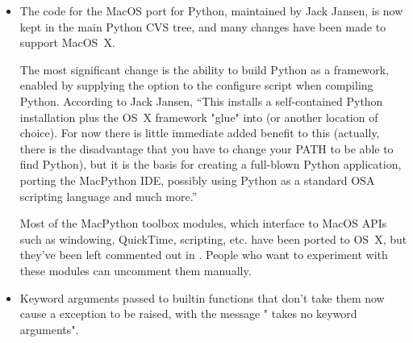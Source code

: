 \documentclass{howto}
\begin{document}
\begin{itemize}

  \item The code for the MacOS port for Python, maintained by Jack
  Jansen, is now kept in the main Python CVS tree, and many changes
  have been made to support MacOS~X.

The most significant change is the ability to build Python as a
framework, enabled by supplying the 
option to the configure script when compiling Python.  According to
Jack Jansen, ``This installs a self-contained Python installation plus
the OS~X framework "glue" into
 (or another location of
choice).  For now there is little immediate added benefit to this
(actually, there is the disadvantage that you have to change your PATH
to be able to find Python), but it is the basis for creating a
full-blown Python application, porting the MacPython IDE, possibly
using Python as a standard OSA scripting language and much more.''

Most of the MacPython toolbox modules, which interface to MacOS APIs
such as windowing, QuickTime, scripting, etc. have been ported to OS~X,
but they've been left commented out in .  People who want
to experiment with these modules can uncomment them manually.

 
  
  \item Keyword arguments passed to builtin functions that don't take them
  now cause a  exception to be raised, with the
  message " takes no keyword arguments".
  

\end{itemize}
\end{document}
